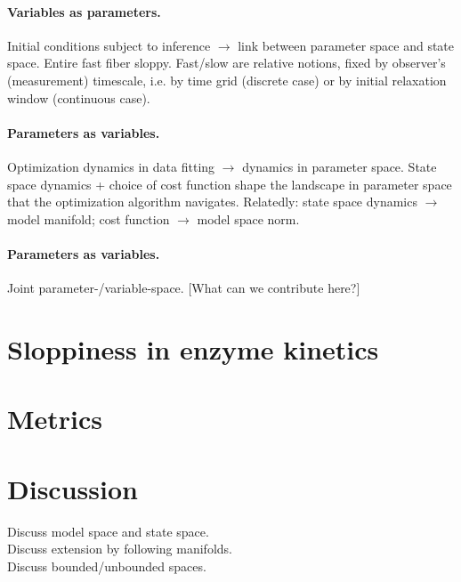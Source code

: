 \documentclass{article}
\begin{document}
\paragraph{Variables as parameters.}
Initial conditions subject to inference $\rightarrow$ link between
parameter space and state space.  Entire fast fiber sloppy.  Fast/slow
are relative notions, fixed by observer's (measurement) timescale,
i.e. by time grid (discrete case) or by initial relaxation window
(continuous case).

\paragraph{Parameters as variables.}
Optimization dynamics in data fitting $\rightarrow$ dynamics in
parameter space. State space dynamics + choice of cost function shape
the landscape in parameter space that the optimization algorithm
navigates.  Relatedly: state space dynamics $\rightarrow$ model
manifold; cost function $\rightarrow$ model space norm.

\paragraph{Parameters as variables.}
Joint parameter-/variable-space.
[What can we contribute here?]


\section{Sloppiness in enzyme kinetics}




\section{Metrics}


\section{Discussion}

Discuss model space and state space.\\

Discuss extension by following manifolds.\\

Discuss bounded/unbounded spaces.\\
\end{document}
